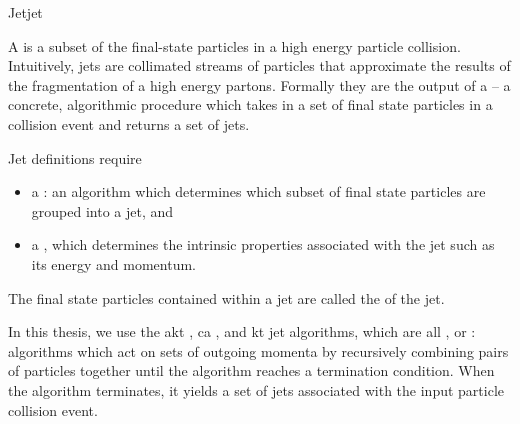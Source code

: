 \begin{definitionbox}{Jet}{jet}



    A  is a subset of the final-state particles in a high energy particle collision.
    Intuitively, jets are collimated streams of particles that approximate the results of the fragmentation of a high energy partons.
    Formally they are the output of a  -- a concrete, algorithmic procedure which takes in a set of final state particles in a collision event and returns a set of jets.

    Jet definitions require
    \begin{itemize}
        \item
            a :
            an algorithm which determines which subset of final state particles are grouped into a jet, and

        \item
            a , which determines the intrinsic properties associated with the jet such as its energy and momentum.
    \end{itemize}

    The final state particles contained within a jet are called the  of the jet.
\end{definitionbox}


In this thesis, we use the \gls{akt} \cite{Cacciari:2008gp}, \gls{ca} \cite{Dokshitzer:1997in,Wobisch:1998wt}, and \gls{kt} \cite{Catani:1991hj,Catani:1993hr} jet algorithms, which are all , or :
%
algorithms which act on sets of outgoing momenta by recursively combining pairs of particles together until the algorithm reaches a termination condition.
%
When the algorithm terminates, it yields a set of jets associated with the input particle collision event.

